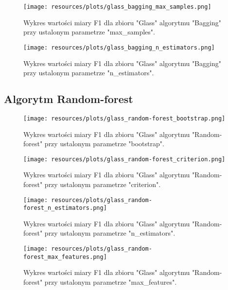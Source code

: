 
\begin{figure}[H]
    \center
    \texttt{[image: resources/plots/glass\_bagging\_max\_samples.png]}
    \caption{Wykres wartości miary F1 dla zbioru "Glass" algorytmu "Bagging" przy ustalonym parametrze "max\_samples".}
\end{figure}

\pagebreak
                    

\begin{figure}[H]
    \center
    \texttt{[image: resources/plots/glass\_bagging\_n\_estimators.png]}
    \caption{Wykres wartości miary F1 dla zbioru "Glass" algorytmu "Bagging" przy ustalonym parametrze "n\_estimators".}
\end{figure}

\pagebreak
                    
\subsection{Algorytm Random-forest}


\begin{figure}[H]
    \center
    \texttt{[image: resources/plots/glass\_random-forest\_bootstrap.png]}
    \caption{Wykres wartości miary F1 dla zbioru "Glass" algorytmu "Random-forest" przy ustalonym parametrze "bootstrap".}   
\end{figure}

\pagebreak
                    

\begin{figure}[H]
    \center
    \texttt{[image: resources/plots/glass\_random-forest\_criterion.png]}
    \caption{Wykres wartości miary F1 dla zbioru "Glass" algorytmu "Random-forest" przy ustalonym parametrze "criterion".}   
\end{figure}

\pagebreak
                    

\begin{figure}[H]
    \center
    \texttt{[image: resources/plots/glass\_random-forest\_n\_estimators.png]}
    \caption{Wykres wartości miary F1 dla zbioru "Glass" algorytmu "Random-forest" przy ustalonym parametrze "n\_estimators".}
\end{figure}                    
                    
\pagebreak


\begin{figure}[H]
    \center
    \texttt{[image: resources/plots/glass\_random-forest\_max\_features.png]}
    \caption{Wykres wartości miary F1 dla zbioru "Glass" algorytmu "Random-forest" przy ustalonym parametrze "max\_features".}
\end{figure}

\pagebreak
